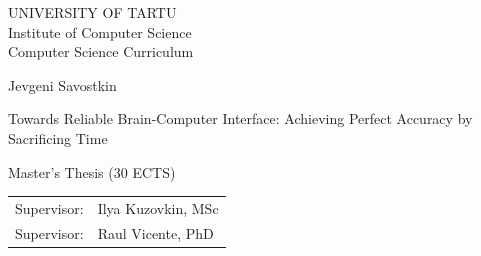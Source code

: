 \documentclass[12pt]{article}
\theoremstyle{definition}
\begin{document}
\thispagestyle{empty}
\begin{center}

\large
UNIVERSITY OF TARTU\\[2mm]
Institute of Computer Science\\
Computer Science Curriculum\\[2mm]

\vspace{25mm}

\Large Jevgeni Savostkin

\vspace{4mm}

\huge Towards Reliable Brain-Computer Interface: Achieving Perfect Accuracy by Sacrificing Time

\vspace{20mm}

\Large Master's Thesis (30 ECTS)

\end{center}

\vspace{2mm}

\begin{flushright}
 {
 \setlength{\extrarowheight}{5pt}
 \begin{tabular}{r l} 
  \sffamily Supervisor: & \sffamily Ilya Kuzovkin, MSc \\ 
  \sffamily Supervisor: & \sffamily Raul Vicente, PhD 
 \end{tabular}
 }
\end{flushright}

\vspace{10mm}

\vspace{2mm}



\vspace{2mm}


\vspace{8mm}
\end{document}
